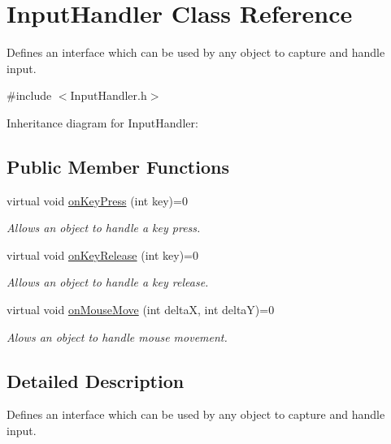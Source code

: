 \hypertarget{class_input_handler}{\section{Input\-Handler Class Reference}
\label{class_input_handler}
}


Defines an interface which can be used by any object to capture and handle input.  




{\ttfamily \#include $<$Input\-Handler.\-h$>$}



Inheritance diagram for Input\-Handler\-:
\subsection*{Public Member Functions}
\begin{DoxyCompactItemize}
\item 
virtual void \hyperlink{class_input_handler_a2d99c4441c45f09a50b52e2a7465e77e}{on\-Key\-Press} (int key)=0
\begin{DoxyCompactList}\small\item\em Allows an object to handle a key press. \end{DoxyCompactList}\item 
virtual void \hyperlink{class_input_handler_a8ca5e25c5fb77079704bc1ebc74ccf04}{on\-Key\-Release} (int key)=0
\begin{DoxyCompactList}\small\item\em Allows an object to handle a key release. \end{DoxyCompactList}\item 
virtual void \hyperlink{class_input_handler_afce8da8c018d9055fd99608b7c7e769c}{on\-Mouse\-Move} (int delta\-X, int delta\-Y)=0
\begin{DoxyCompactList}\small\item\em Alows an object to handle mouse movement. \end{DoxyCompactList}\end{DoxyCompactItemize}


\subsection{Detailed Description}
Defines an interface which can be used by any object to capture and handle input. 

